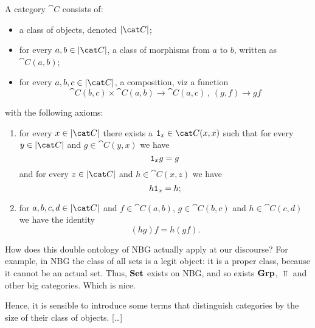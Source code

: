 \begin{definition}[Categories]
A category \(\cat C\) consists of:
\begin{itemize}
\item a class of objects, denoted \(\obj{\cat C}\);
\item for every \(a, b \in \obj{\cat C}\), a class of morphisms from \(a\) to \(b\), written as \(\cat C(a, b)\);
\item for every \(a, b, c \in \obj{\cat C}\), a composition, viz a function
\[\cat C(b, c) \times \cat C(a, b) \to \cat C(a, c) \,, \ (g, f) \to gf\]
\end{itemize}
with the following axioms:
\begin{enumerate}
\item for every \(x \in \obj{\cat C}\) there exists a \(\id_x \in \cat C(x, x)\) such that for every \(y \in \obj{\cat C}\) and \(g \in \cat C(y, x)\) we have
\[\mathtt 1_x g = g\]
and for every \(z \in \obj{\cat C}\) and \(h \in \cat C(x, z)\) we have
\[h \mathtt 1_x = h ;\]
\item for \(a, b, c, d \in \obj{\cat C}\) and \(f \in \cat C(a, b)\), \(g \in \cat C(b, c)\) and \(h \in \cat C(c, d)\) we have the identity
\[(h g) f = h (g f) .\]
\end{enumerate}
\end{definition}

How does this double ontology of NBG actually apply at our discourse? For example, in NBG the class of all sets is a legit object: it is a proper class, because it cannot be an actual set. Thus, \(\mathbf{Set}\) exists on NBG, and so exists \(\mathbf{Grp}\), \(\Top\) and other big categories. Which is nice.

Hence, it is sensible to introduce some terms that distinguish categories by the size of their class of objects. [\dots{}]





